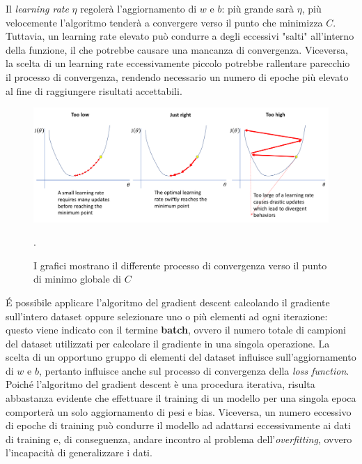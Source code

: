 Il \textit{learning rate} $\eta$ regolerà l’aggiornamento di $w$ e $b$: più 
grande sarà $\eta$, più velocemente l’algoritmo tenderà a convergere verso il 
punto che minimizza $C$.
Tuttavia, un learning rate elevato può condurre a degli eccessivi "salti" all’interno della
funzione, il che potrebbe causare una mancanza di convergenza.
Viceversa, la scelta di un learning rate eccessivamente piccolo potrebbe rallentare 
parecchio il processo di convergenza, rendendo necessario un numero di epoche più elevato
al fine di raggiungere risultati accettabili.

\begin{figure}[H]
    \centering
    \includegraphics[width=1\textwidth]{Immagini/Grafici/esempioLR.png}
    \caption{ I grafici mostrano il differente processo di convergenza verso il punto di minimo
    globale di $C$ \cite{LearningRate_optimizer}}.

\end{figure}

\'E possibile applicare l’algoritmo del gradient descent calcolando il gradiente 
sull'intero dataset oppure selezionare uno o più elementi ad ogni 
iterazione: questo viene indicato con il termine \textbf{batch}, ovvero il numero totale di 
campioni del dataset utilizzati per calcolare il gradiente in una singola 
operazione. La scelta di un opportuno gruppo di elementi del
dataset influisce sull'aggiornamento di $w$ e $b$, pertanto influisce anche sul processo di 
convergenza della \textit{loss function}.
Poiché l’algoritmo del gradient descent è una procedura iterativa, 
risulta abbastanza evidente che effettuare il training di un modello per una singola 
epoca comporterà un solo aggiornamento di pesi e bias. Viceversa, un numero 
eccessivo di epoche di training può condurre il modello ad adattarsi eccessivamente 
ai dati di training e, di conseguenza, andare incontro al problema 
dell’\textit{overfitting}, ovvero l'incapacità di generalizzare i dati.

